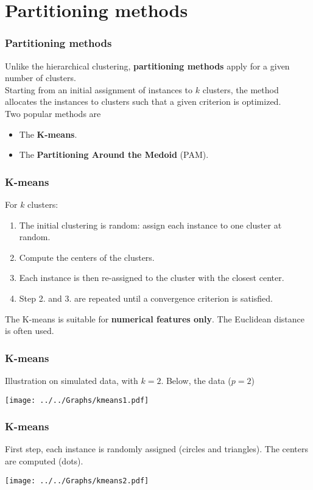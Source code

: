 \section{Partitioning methods}
\begin{frame}
\frametitle{Partitioning methods}
Unlike the hierarchical clustering, {\bf partitioning methods} apply for a given number of clusters. \\
\vspace{0.3cm}
Starting from an initial assignment of instances to $k$ clusters, the method allocates the instances to clusters such that a given criterion is optimized. \\
\vspace{0.3cm}
Two popular methods are 
\begin{itemize}
\item The {\bf K-means}.
\item The {\bf Partitioning Around the Medoid} (PAM). 
\end{itemize}
\end{frame}
\begin{frame}
\frametitle{K-means}
For $k$ clusters:
\begin{enumerate}
\item The initial clustering is random: assign each instance to one cluster at random.
\item Compute the centers of the clusters. 
\item Each instance is then re-assigned to the cluster with the closest center.
\item Step 2. and 3. are repeated until a convergence criterion is satisfied.
\end{enumerate}
The K-means is suitable for {\bf numerical features only}. The Euclidean distance is often used.
\end{frame}
\begin{frame}
\frametitle{K-means}
Illustration on simulated data, with $k=2$. Below, the data ($p=2$)
\begin{center}
\texttt{[image: ../../Graphs/kmeans1.pdf]}
\end{center}
\end{frame}
\begin{frame}
\frametitle{K-means}
First step, each instance is randomly assigned (circles and triangles). The centers are computed (dots).
\begin{center}
\texttt{[image: ../../Graphs/kmeans2.pdf]}
\end{center}
\end{frame}
